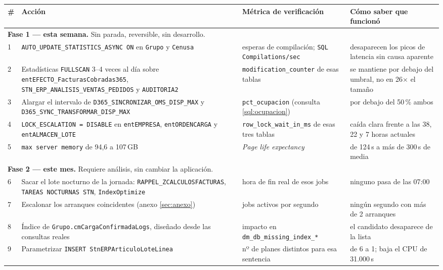 \documentclass[11pt,a4paper]{article}
\newcommand{\cod}[1]{\texttt{\small #1}}
\begin{document}
\begin{longtable}{p{0.7cm}p{4.9cm}p{4.3cm}p{4.6cm}}
\toprule
\textbf{\#} & \textbf{Acción} & \textbf{Métrica de verificación} &
\textbf{Cómo saber que funcionó} \\
\midrule
\endhead
\multicolumn{4}{l}{\cellcolor{acento!10}\textbf{Fase 1 — esta semana.} Sin
parada, reversible, sin desarrollo.} \\
\midrule
1 & \cod{AUTO\_UPDATE\_STATISTICS\_ASYNC ON} en \cod{Grupo} y \cod{Cenusa}
  & esperas de compilación; \cod{SQL Compilations/sec}
  & desaparecen los picos de latencia sin causa aparente \\
2 & Estadísticas \cod{FULLSCAN} 3--4 veces al día sobre
    \cod{entEFECTO\_FacturasCobradas365}, \cod{STN\_ERP\_ANALISIS\_VENTAS\_PEDIDOS}
    y \cod{AUDITORIA2}
  & \cod{modification\_counter} de esas tablas
  & se mantiene por debajo del umbral, no en 26$\times$ el tamaño \\
3 & Alargar el intervalo de \cod{D365\_SINCRONIZAR\_OMS\_DISP\_MAX} y
    \cod{D365\_SYNC\_TRANSFORMAR\_DISP\_MAX}
  & \cod{pct\_ocupacion} (consulta \ref{sql:ocupacion})
  & por debajo del 50\,\% ambos \\
4 & \cod{LOCK\_ESCALATION = DISABLE} en \cod{entEMPRESA},
    \cod{entORDENCARGA} y \cod{entALMACEN\_LOTE}
  & \cod{row\_lock\_wait\_in\_ms} de esas tres tablas
  & caída clara frente a las 38, 22 y 7 horas actuales \\
5 & \cod{max server memory} de 94,6 a 107\,GB
  & \emph{Page life expectancy}
  & de 124\,s a más de 300\,s de media \\
\midrule
\multicolumn{4}{l}{\cellcolor{acento!10}\textbf{Fase 2 — este mes.} Requiere
análisis, sin cambiar la aplicación.} \\
\midrule
6 & Sacar el lote nocturno de la jornada: \cod{RAPPEL\_ZCALCULOSFACTURAS},
    \cod{TAREAS NOCTURNAS STN}, \cod{IndexOptimize}
  & hora de fin real de esos jobs
  & ninguno pasa de las 07:00 \\
7 & Escalonar los arranques coincidentes (anexo \ref{sec:anexo})
  & jobs activos por segundo
  & ningún segundo con más de 2 arranques \\
8 & Índice de \cod{Grupo.cmCargaConfirmadaLogs}, diseñado desde las consultas
    reales
  & impacto en \cod{dm\_db\_missing\_index\_*}
  & el candidato desaparece de la lista \\
9 & Parametrizar \cod{INSERT StnERPArticuloLoteLinea}
  & nº de planes distintos para esa sentencia
  & de 6 a 1; baja el CPU de 31.000\,s \\

\end{longtable}
\end{document}
